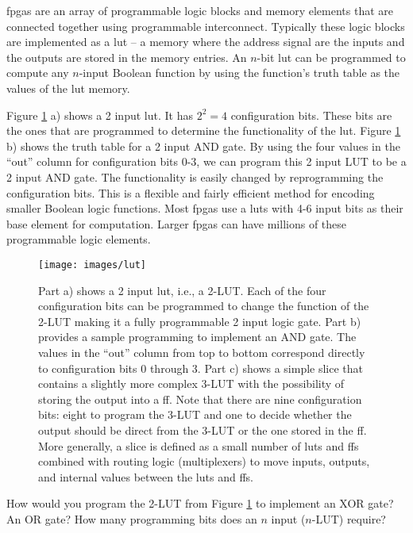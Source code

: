 \glspl{fpga} are an array of programmable logic blocks and memory elements that are connected together using programmable interconnect. Typically these logic blocks are implemented as a \gls{lut} -- a memory where the address signal are the inputs and the outputs are stored in the memory entries. An $n$-bit \gls{lut} can be programmed to compute any $n$-input Boolean function by using the function's truth table as the values of the \gls{lut} memory. 

Figure \ref{fig:lut} a) shows a 2 input \gls{lut}. It has $2^2 = 4$ configuration bits. These bits are the ones that are programmed to determine the functionality of the \gls{lut}.  Figure \ref{fig:lut} b) shows the truth table for a 2 input AND gate. By using the four values in the ``out'' column for configuration bits 0-3, we can program this 2 input LUT to be a 2 input AND gate. The functionality is easily changed by reprogramming the configuration bits. This is a flexible and fairly efficient method for encoding smaller Boolean logic functions. Most \glspl{fpga} use a \glspl{lut} with 4-6 input bits as their base element for computation. Larger \glspl{fpga} can have millions of these programmable logic elements.

\begin{figure}
\centering
\texttt{[image: images/lut]}
\caption{Part a) shows a 2 input \gls{lut}, i.e., a 2-LUT. Each of the four configuration bits can be programmed to change the function of the 2-LUT making it a fully programmable 2 input logic gate. Part b) provides a sample programming to implement an AND gate.  The values in the ``out'' column from top to bottom correspond directly to configuration bits 0 through 3. Part c) shows a simple \gls{slice} that contains a slightly more complex 3-LUT with the possibility of storing the output into a \gls{ff}. Note that there are nine configuration bits: eight to program the 3-LUT and one to decide whether the output should be direct from the 3-LUT or the one stored in the \gls{ff}. More generally, a \gls{slice} is defined as a small number of \glspl{lut} and \glspl{ff} combined with routing logic (multiplexers) to move inputs, outputs, and internal values between the \glspl{lut} and \glspl{ff}.}
\label{fig:lut}
\end{figure}

\begin{exercise}
How would you program the 2-LUT from Figure \ref{fig:lut} to implement an XOR gate? An OR gate? How many programming bits does an $n$ input ($n$-LUT) require?
\end{exercise}

